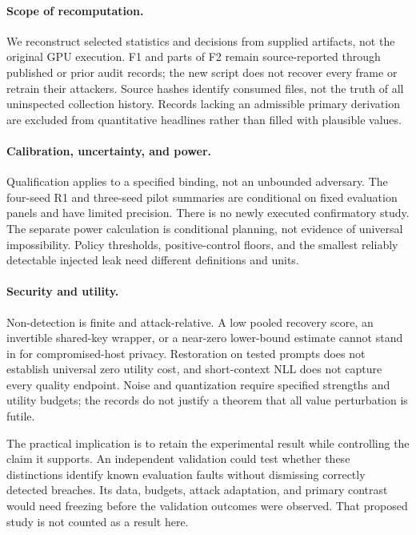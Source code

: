\paragraph{Scope of recomputation.}
We reconstruct selected statistics and decisions from supplied artifacts,
not the original GPU execution. F1 and parts of F2 remain source-reported
through published or prior audit records; the new script does not recover
every frame or retrain their attackers. Source hashes identify consumed
files, not the truth of all uninspected collection history. Records lacking
an admissible primary derivation are excluded from quantitative headlines
rather than filled with plausible values.

\paragraph{Calibration, uncertainty, and power.}
Qualification applies to a specified binding, not an unbounded adversary.
The four-seed R1 and three-seed pilot summaries are conditional on fixed
evaluation panels and have limited precision. There is no newly executed
confirmatory study. The separate power calculation is conditional planning,
not evidence of universal impossibility. Policy thresholds, positive-control
floors, and the smallest reliably detectable injected leak need different
definitions and units.

\paragraph{Security and utility.}
Non-detection is finite and attack-relative. A low pooled recovery score,
an invertible shared-key wrapper, or a near-zero lower-bound estimate cannot
stand in for compromised-host privacy. Restoration on tested prompts does
not establish universal zero utility cost, and short-context NLL does not
capture every quality endpoint. Noise and quantization require specified
strengths and utility budgets; the records do not justify a theorem that
all value perturbation is futile.

The practical implication is to retain the experimental result while
controlling the claim it supports. An independent validation could test
whether these distinctions identify known evaluation faults without
dismissing correctly detected breaches. Its data, budgets, attack
adaptation, and primary contrast would need freezing before the validation
outcomes were observed. That proposed study is not counted as a result here.

